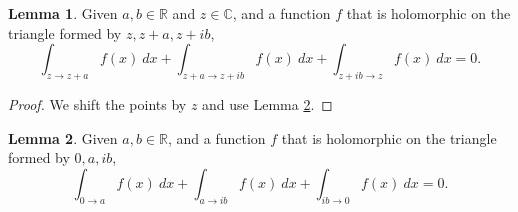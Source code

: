 \documentclass{report}
\theoremstyle{definition}
\newtheorem{lemma}{Lemma}
\begin{document}
\begin{lemma}
  \label{cauchyOnRightTriangle}
  Given $a,b\in\mathbb R$ and $z\in\mathbb C$, and a function $f$ that is holomorphic on the triangle formed by $z,z+a,z+ib$,
  \begin{equation}
    \int_{z\to z+a} f(x)\ dx
    +
    \int_{z+a\to z+ib} f(x)\ dx
    +
    \int_{z+ib\to z} f(x)\ dx
    =0
    .
  \end{equation}
\end{lemma}

\begin{proof}
  We shift the points by $z$ and use Lemma \ref{cauchyOnRightTriangle_origin}.
\end{proof}

\begin{lemma}
  \label{cauchyOnRightTriangle_origin}
  Given $a,b\in\mathbb R$, and a function $f$ that is holomorphic on the triangle formed by $0,a,ib$,
  \begin{equation}
    \int_{0\to a} f(x)\ dx
    +
    \int_{a\to ib} f(x)\ dx
    +
    \int_{ib\to 0} f(x)\ dx
    =0
    .
  \end{equation}
\end{lemma}
\end{document}
